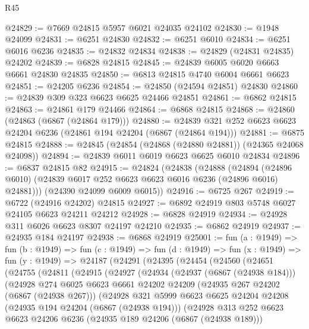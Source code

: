 \begin{lexlean}{R45}
\begin{coremodule}
{@24829 := @7669 @24815 @5957 @6021 @24035 @24102
@24830 := @1948 @24099
@24831 := @6251 @24830
@24832 := @6251 @6010
@24834 := @6251 @6016 @6236
@24835 := @24832 @24834
@24838 := @24829 (@24831 @24835) @24202
@24839 := @6828 @24815
@24845 := @24839 @6005 @6020 @6663 @6661 @24830 @24835
@24850 := @6813 @24815 @4740 @6004 @6661 @6623
@24851 := @24205 @6236
@24854 := @24850 (@24594 @24851) @24830
@24860 := @24839 @309 @323 @6623 @6625 @24466 @24851
@24861 := @6862 @24815
@24863 := @24861 @179 @24466
@24864 := @6868 @24815
@24868 := @24860 (@24863 (@6867 (@24864 @179)))
@24880 := @24839 @321 @252 @6623 @6623 @24204 @6236 (@24861 @194 @24204 (@6867 (@24864 @194)))
@24881 := @6875 @24815
@24888 := @24845 (@24854 (@24868 (@24880 @24881)) (@24365 @24068 @24098))
@24894 := @24839 @6011 @6019 @6623 @6625 @6010 @24834
@24896 := @6837 @24815 @82
@24915 := @24824
    (@24838
      (@24888
        (@24894 (@24896 @6010) (@24839 @6017 @252 @6623 @6623 @6016 @6236 (@24896 @6016) @24881)))
      (@24390 @24099 @6009 @6015))
@24916 := @6725 @267
@24919 := @6722 (@24916 @24202) @24815
@24927 := @6892 @24919 @803 @5748 @6027 @24105 @6623 @24211 @24212
@24928 := @6828 @24919
@24934 := @24928 @311 @6026 @6623 @8307 @24197 @24210
@24935 := @6862 @24919
@24937 := @24935 @184 @24197
@24938 := @6868 @24919
@25001 := fun (a : @1949) =>
  fun (b : @1949) =>
  fun (c : @1949) =>
  fun (d : @1949) =>
  fun (x : @1949) =>
  fun (y : @1949) =>
  @24187
    (@24291
      (@24395
        (@24454
          (@24560
            (@24651
              (@24755
                (@24811
                  (@24915
                    (@24927
                      (@24934
                        (@24937 (@6867 (@24938 @184)))
                        (@24928
                          @274
                          @6025
                          @6623
                          @6661
                          @24202
                          @24209
                          (@24935 @267 @24202 (@6867 (@24938 @267)))
                          (@24928
                            @321
                            @5999
                            @6623
                            @6625
                            @24204
                            @24208
                            (@24935 @194 @24204 (@6867 (@24938 @194)))
                            (@24928
                              @313
                              @252
                              @6623
                              @6623
                              @24206
                              @6236
                              (@24935 @189 @24206 (@6867 (@24938 @189)))
}
\end{coremodule}
\end{lexlean}
